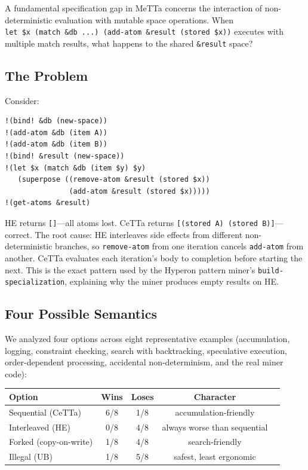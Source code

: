 \documentclass[11pt]{article}
\newcommand{\code}[1]{\texttt{#1}}
\newcommand{\HE}{\textup{HE}}
\newcommand{\CeTTa}{\textup{CeTTa}}
\begin{document}
A fundamental specification gap in MeTTa concerns the interaction of
non-deterministic evaluation with mutable space operations.  When
\code{let~\$x~(match~\&db~...)~(add-atom~\&result~(stored~\$x))}
executes with multiple match results, what happens to the shared
\code{\&result} space?

\subsection{The Problem}

Consider:
\begin{lstlisting}[language={},basicstyle=\ttfamily\scriptsize]
!(bind! &db (new-space))
!(add-atom &db (item A))
!(add-atom &db (item B))
!(bind! &result (new-space))
!(let $x (match &db (item $y) $y)
   (superpose ((remove-atom &result (stored $x))
               (add-atom &result (stored $x)))))
!(get-atoms &result)
\end{lstlisting}

\HE{} returns \code{[]}---all atoms lost.  \CeTTa{} returns
\code{[(stored~A)~(stored~B)]}---correct.  The root cause:
\HE{} interleaves side effects from different non-deterministic
branches, so \code{remove-atom} from one iteration cancels
\code{add-atom} from another.  \CeTTa{} evaluates each iteration's
body to completion before starting the next.  This is the exact
pattern used by the Hyperon pattern miner's
\code{build-specialization}, explaining why the miner produces
empty results on \HE{}.

\subsection{Four Possible Semantics}

We analyzed four options across eight representative examples
(accumulation, logging, constraint checking, search with
backtracking, speculative execution, order-dependent processing,
accidental non-determinism, and the real miner code):

\begin{center}
\begin{tabular}{lcccc}
\toprule
Option & Wins & Loses & Character \\
\midrule
Sequential (CeTTa)  & 6/8 & 1/8 & accumulation-friendly \\
Interleaved (HE)    & 0/8 & 4/8 & always worse than sequential \\
Forked (copy-on-write) & 1/8 & 4/8 & search-friendly \\
Illegal (UB)        & 1/8 & 5/8 & safest, least ergonomic \\
\bottomrule
\end{tabular}
\end{center}
\end{document}
